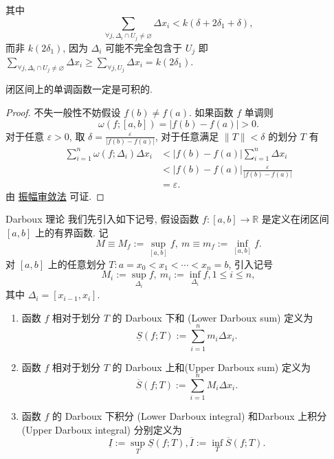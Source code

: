 \documentclass[cn,toc=twocol]{elegantbook}
\newcommand{\ITEMS}{\begin{enumerate}}
\newcommand{\ITEME}{\end{enumerate}}
\newcommand{\R}{\mathbb{R}}
\newcommand{\ds}{\displaystyle}
\begin{document}
\begin{remark}
	其中
	\[
		\sum_{\forall j, \Delta_i \cap U_j \neq \varnothing} \Delta x_i < k(\delta + 2\delta_1 + \delta),
	\]
	而非 $\ds k(2\delta_1)$, 因为 $\Delta_i$ 可能不完全包含于 $U_j$ 即 $\ds \sum_{\forall j, \Delta_i \cap U_j \neq \varnothing} \Delta x_i \ge \sum_{\forall j,U_j} \Delta x_i = k(2\delta_1)$.
\end{remark}


\begin{corollary}
	闭区间上的单调函数一定是可积的.
\end{corollary}

\begin{proof}
	不失一般性不妨假设 $f(b) \neq f(a)$. 如果函数 $f$ 单调则
	\[
		\omega(f; [a,b]) = \lvert f(b) - f(a) \rvert > 0.
	\]
	对于任意 $\varepsilon > 0$, 取 $\ds \delta = \frac{\varepsilon}{\lvert f(b) - f(a) \rvert}$, 对于任意满足 $\lVert T \rVert < \delta$ 的划分 $T$ 有
	\[
	\begin{aligned}
		\sum_{i=1}^n \omega(f; \Delta_i) \Delta x_i &< \lvert f(b) - f(a) \rvert \sum_{i=1}^n \Delta x_i\\
		&< \lvert f(b) - f(a) \rvert \frac{\varepsilon}{\lvert f(b) - f(a) \rvert}\\
		&= \varepsilon.
	\end{aligned}
	\]
	由 \hyperref[thm:darbouxct]{振幅审敛法} 可证.
\end{proof}

\begin{definition}{Darboux 理论}
	我们先引入如下记号, 假设函数 $f : [a,b] \to \R$ 是定义在闭区间 $[a,b]$ 上的有界函数. 记
	\[
		M \equiv M_f := \sup_{[a,b]}f,\ m \equiv m_f := \inf_{[a,b]} f.
	\]
	对 $[a,b]$ 上的任意划分 $T: a = x_0 < x_1 < \cdots < x_n = b$, 引入记号
	\[
		M_i := \sup_{\Delta_i}f,\ m_i := \inf_{\Delta_i}f, 1 \le i \le n,
	\]
	其中 $\Delta_i = [x_{i−1}, x_i]$.
	\vspace{0.5em}
	
	\ITEMS
	\item 函数 $f$ 相对于划分 $T$ 的 Darboux 下和 (Lower Darboux sum) 定义为
	\[
		\underline{S}(f; T) := \sum_{i=1}^n m_i \Delta x_i.
	\]
	
	\item 函数 $f$ 相对于划分 $T$ 的 Darboux 上和(Upper Darboux sum) 定义为
	\[
		\overline{S}(f; T) := \sum_{i=1}^n M_i \Delta x_i.
	\]
	
	\item 函数 $f$ 的 Darboux 下积分 (Lower Darboux integral) 和Darboux 上积分(Upper Darboux integral) 分别定义为
	\[
		\underline{I} := \sup_{T} \underline{S} (f;T), \overline{I} := \inf_{T}\overline
		{S} (f;T).
	\]
	\ITEME
\end{definition}
\end{document}

